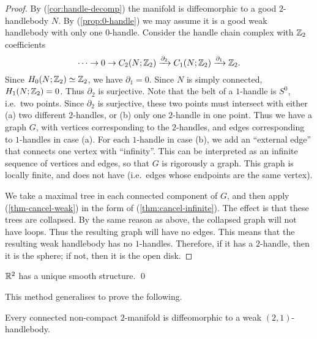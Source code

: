 \begin{proof}
By (\ref{cor:handle-decomp}) the manifold is diffeomorphic to a good $2$-handlebody $N$.
By (\ref{prop:0-handle}) we may assume it is a good weak handlebody with only one $0$-handle.
Consider the handle chain complex with $\mathbb{Z}_2$ coefficients
\[ \cdots\to0\to C_2(N;\mathbb{Z}_2)\xrightarrow{\partial_2}C_1(N;\mathbb{Z}_2)\xrightarrow{\partial_1}\mathbb{Z}_2. \]
Since $H_0(N;\mathbb{Z}_2)\simeq\mathbb{Z}_2$, we have $\partial_1=0$.
Since $N$ is simply connected, $H_1(N;\mathbb{Z}_2)=0$. Thus $\partial_2$ is surjective.
Note that the belt of a $1$-handle is $S^0$, i.e.\ two points.
Since $\partial_2$ is surjective,
these two points must intersect with either (a) two different $2$-handles,
or (b) only one $2$-handle in one point.
Thus we have a graph $G$,
with vertices corresponding to the $2$-handles,
and edges corresponding to $1$-handles in case (a).
For each $1$-handle in case (b), we add an ``external edge'' that connects one vertex with ``infinity''.
This can be interpreted as an infinite sequence of vertices and edges,
so that $G$ is rigorously a graph.
This graph is locally finite, and does not have 
(i.e.\ edges whose endpoints are the same vertex).

We take a maximal tree in each connected component of $G$,
and then apply (\ref{thm-cancel-weak}) in the form of (\ref{thm:cancel-infinite}).
The effect is that these trees are collapsed.
By the same reason as above, the collapsed graph will not have loops.
Thus the resulting graph will have no edges.
This means that the resulting weak handlebody has no $1$-handles.
Therefore, if it has a $2$-handle, then it is the sphere;
if not, then it is the open disk.
\end{proof}

\begin{corollary}
    $\mathbb{R}^2$ has a unique smooth structure. \qed
\end{corollary}

This method generalises to prove the following.

\begin{theorem}\label{thm:2-mfd-noncompact}
Every connected non-compact $2$-manifold is diffeomorphic to a weak $(2,1)$-handlebody.
\end{theorem}

